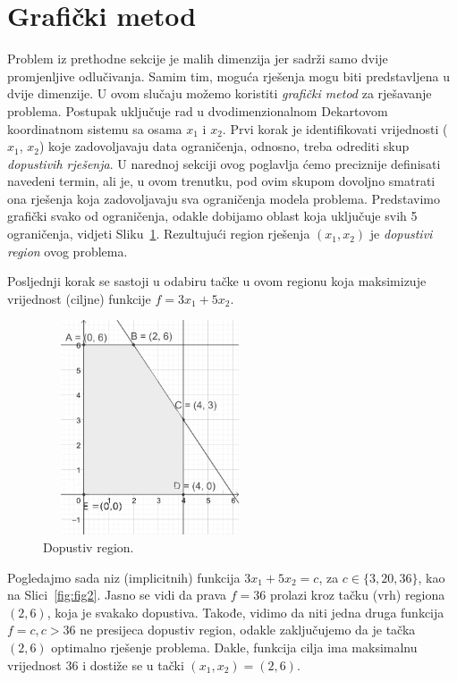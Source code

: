 \documentclass[a4paper, utf8, 11pt, colorlinks]{book}
\theoremstyle{definition}
\begin{document}
\section{Grafički metod}
 Problem iz prethodne sekcije je malih dimenzija jer sadrži samo dvije promjenljive odlučivanja. Samim tim,  moguća rješenja mogu biti predstavljena u dvije dimenzije. U ovom slučaju možemo koristiti \emph{grafički metod} za rješavanje problema. Postupak uključuje rad u dvodimenzionalnom Dekartovom koordinatnom sistemu sa osama $x_1$ i $x_2$.  Prvi korak je identifikovati vrijednosti ($x_1$, $x_2$) koje zadovoljavaju data ograničenja, odnosno, treba odrediti skup \emph{dopustivih rješenja}.    U narednoj sekciji ovog poglavlja ćemo preciznije definisati navedeni termin, ali je, u ovom trenutku, pod ovim skupom dovoljno smatrati ona rješenja koja zadovoljavaju sva ograničenja modela  problema. Predstavimo grafički svako od ograničenja, odakle dobijamo oblast koja uključuje svih 5 ograničenja, vidjeti Sliku~\ref{fig:fig1}.  Rezultujući region rješenja $(x_1, x_2)$ je \emph{dopustivi region} ovog problema.
 
 Posljednji korak se sastoji u odabiru tačke u ovom regionu  koja maksimizuje vrijednost (ciljne) funkcije $f = 3x_1 + 5x_2$. 

\begin{figure}
    \centering
    \includegraphics[width=180pt,height=180pt]{fig1.eps}
    \caption{Dopustiv region.}
    \label{fig:fig1}
\end{figure}
Pogledajmo sada niz (implicitnih) funkcija $3x_1 + 5 x_2 = c$, za $c \in \{3,20, 36\}$, kao na Slici~\ref{fig:fig2}. Jasno se vidi da prava $f = 36$ prolazi kroz tačku (vrh) regiona $(2,6)$, koja je svakako dopustiva. Takođe, vidimo da niti jedna druga funkcija $f=c, c > 36$ ne presijeca dopustiv region, odakle zaključujemo da je tačka $(2, 6)$ optimalno rješenje problema. Dakle, funkcija cilja ima maksimalnu vrijednost 36 i dostiže se u tački $(x_1, x_2)=(2,6)$.
\end{document}

